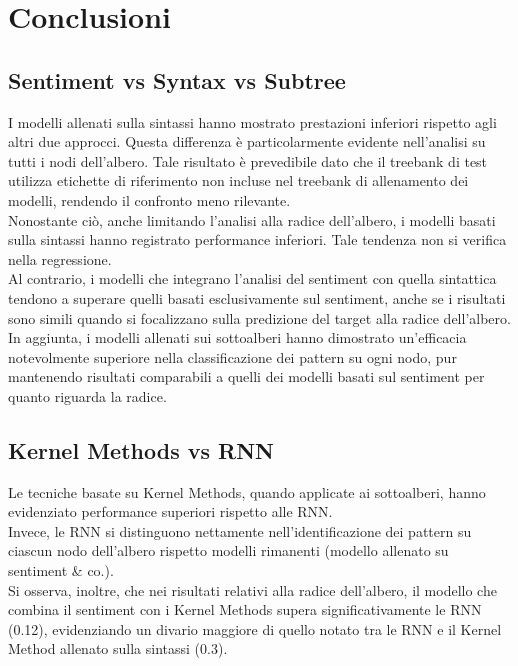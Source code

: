 \section{Conclusioni}

\subsection{Sentiment vs Syntax vs Subtree}

I modelli allenati sulla sintassi hanno mostrato prestazioni inferiori 
rispetto agli altri due approcci. Questa differenza è particolarmente evidente 
nell'analisi su tutti i nodi dell'albero. Tale risultato è prevedibile dato 
che il treebank di test utilizza etichette di riferimento non incluse
nel treebank di allenamento dei modelli, rendendo il confronto meno rilevante.\\
Nonostante ciò, anche limitando l'analisi alla radice dell'albero, i modelli 
basati sulla sintassi hanno registrato performance inferiori. Tale tendenza non 
si verifica nella regressione. \\
Al contrario, i modelli che integrano l'analisi del sentiment con quella
sintattica tendono a superare quelli basati esclusivamente sul sentiment, anche
se i risultati sono simili quando si focalizzano sulla predizione del target
alla radice dell'albero.\\
In aggiunta, i modelli allenati sui sottoalberi hanno dimostrato un'efficacia
notevolmente superiore nella classificazione dei pattern su ogni nodo, pur
mantenendo risultati comparabili a quelli dei modelli basati sul sentiment per
quanto riguarda la radice.

\subsection{Kernel Methods vs RNN}

Le tecniche basate su Kernel Methods, quando applicate ai sottoalberi, hanno
evidenziato performance superiori rispetto alle RNN. \\
Invece, le RNN si distinguono nettamente nell'identificazione dei pattern su 
ciascun nodo dell'albero rispetto modelli rimanenti (modello allenato su 
sentiment \& co.).\\
Si osserva, inoltre, che nei risultati relativi alla radice dell'albero, il
modello che combina il sentiment con i Kernel Methods supera
significativamente le RNN (0.12), evidenziando un divario maggiore di quello 
notato tra le RNN e il Kernel Method allenato sulla sintassi (0.3).
